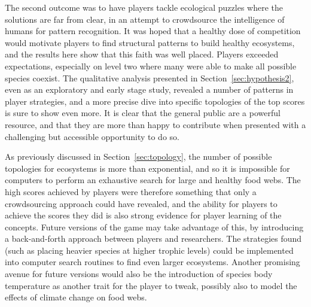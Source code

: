 The second outcome was to have players tackle ecological puzzles where the solutions are far from clear, in an attempt to crowdsource the intelligence of humans for pattern recognition. It was hoped that a healthy dose of competition would motivate players to find structural patterns to build healthy ecosystems, and the results here show that this faith was well placed. Players exceeded expectations, especially on level two where many were able to make all possible species coexist.
The qualitative analysis presented in Section~\ref{sec:hypothesis2}, even as an exploratory and early stage study, revealed a number of patterns in player strategies, and a more precise dive into specific topologies of the top scores is sure to show even more.
It is clear that the general public are a powerful resource, and that they are more than happy to contribute when presented with a challenging but accessible opportunity to do so.

As previously discussed in Section~\ref{sec:topology}, the number of possible topologies for ecosystems is more than exponential, and so it is impossible for computers to perform an exhaustive search for large and healthy food webs. The high scores achieved by players were therefore something that only a crowdsourcing approach could have revealed, and the ability for players to achieve the scores they did is also strong evidence for player learning of the concepts.
Future versions of the game may take advantage of this, by introducing a back-and-forth approach between players and researchers. The strategies found (such as placing heavier species at higher trophic levels) could be implemented into computer search routines to find even larger ecosystems.
Another promising avenue for future versions would also be the introduction of species body temperature as another trait for the player to tweak, possibly also to model the effects of climate change on food webs.



